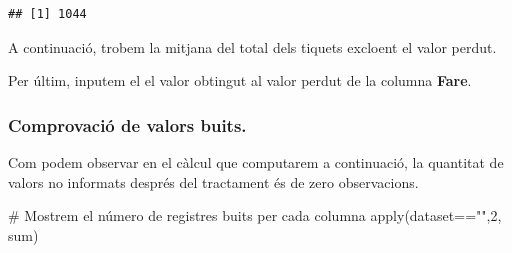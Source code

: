 \documentclass[
]{article}
\newenvironment{Shaded}{\begin{snugshade}}{\end{snugshade}}
\newcommand{\AttributeTok}[1]{\textcolor[rgb]{0.80,0.80,0.80}{#1}}
\newcommand{\CommentTok}[1]{\textcolor[rgb]{0.50,0.62,0.50}{#1}}
\newcommand{\ConstantTok}[1]{\textcolor[rgb]{0.86,0.64,0.64}{\textbf{#1}}}
\newcommand{\DecValTok}[1]{\textcolor[rgb]{0.86,0.86,0.80}{#1}}
\newcommand{\FunctionTok}[1]{\textcolor[rgb]{0.94,0.94,0.56}{#1}}
\newcommand{\NormalTok}[1]{\textcolor[rgb]{0.80,0.80,0.80}{#1}}
\newcommand{\OtherTok}[1]{\textcolor[rgb]{0.94,0.94,0.56}{#1}}
\newcommand{\SpecialCharTok}[1]{\textcolor[rgb]{0.86,0.64,0.64}{#1}}
\newcommand{\StringTok}[1]{\textcolor[rgb]{0.80,0.58,0.58}{#1}}
\begin{document}
\begin{Shaded}
\end{Shaded}

\begin{verbatim}
## [1] 1044
\end{verbatim}

A continuació, trobem la mitjana del total dels tiquets excloent el
valor perdut.

\begin{Shaded}
\end{Shaded}

Per últim, inputem el el valor obtingut al valor perdut de la columna
\textbf{Fare}.

\begin{Shaded}
\end{Shaded}

\hypertarget{comprovaciuxf3-de-valors-buits.}{%
\subsubsection{Comprovació de valors
buits.}\label{comprovaciuxf3-de-valors-buits.}}

Com podem observar en el càlcul que computarem a continuació, la
quantitat de valors no informats després del tractament és de zero
observacions.

\begin{Shaded}
\begin{Highlighting}[]
\CommentTok{\# Mostrem el número de registres buits per cada columna }
\FunctionTok{apply}\NormalTok{(dataset}\SpecialCharTok{==}\StringTok{""}\NormalTok{,}\DecValTok{2}\NormalTok{, sum)}
\end{Highlighting}
\end{Shaded}
\end{document}
